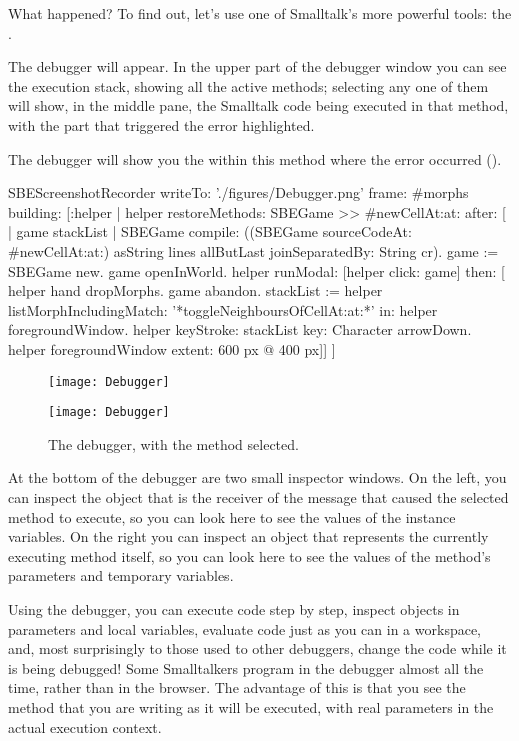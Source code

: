 \documentclass[a4paper,10pt,twoside]{book}
\begin{document}
\noindent
What happened?
To find out, let's use one of Smalltalk's more powerful tools: the .

The debugger will appear.
In the upper part of the debugger window you can see the execution stack, showing all the active methods; selecting any one of them will show, in the middle pane, the Smalltalk code being executed in that method, with the part that triggered the error highlighted.

The debugger will show you the  within this method where the error occurred ().

\begin{ExecuteSmalltalkScript}
SBEScreenshotRecorder writeTo: './figures/Debugger.png' frame: #morphs building: [:helper |
	helper restoreMethods: {SBEGame >> #newCellAt:at:} after: [
		| game stackList |
		SBEGame compile: ((SBEGame sourceCodeAt: #newCellAt:at:) asString
			lines allButLast joinSeparatedBy: String cr).
		game := SBEGame new.
		game openInWorld.
		helper
			runModal: [helper click: game]
			then: [
				helper hand dropMorphs.
				game abandon.
				stackList := helper listMorphIncludingMatch: '*toggleNeighboursOfCellAt:at:*' in: helper foregroundWindow.
				helper keyStroke: stackList key: Character arrowDown.
				helper foregroundWindow extent: 600 px @ 400 px]]
]
\end{ExecuteSmalltalkScript}
\begin{figure}[ht]
\ifluluelse
	{\centerline {\texttt{[image: Debugger]}}}
	{\centerline {\texttt{[image: Debugger]}}}
\caption{The debugger, with the method   selected.
\label{fig:debugToggle}}
\end{figure}

At the bottom of the debugger are two small inspector windows.
On the left, you can inspect the object that is the receiver of the message that caused the selected method to execute, so you can look here to see the values of the instance variables.
On the right you can inspect an object that represents the currently executing method itself, so you can look here to see the values of the method's parameters and temporary variables.

Using the debugger, you can execute code step by step, inspect objects in parameters and local variables, evaluate code just as you can in a workspace, and, most surprisingly to those used to other debuggers, change the code while it is being debugged!
Some Smalltalkers program in the debugger almost all the time, rather than in the browser.
The advantage of this is that you see the method that you are writing as it will be executed, with real parameters in the actual execution context.
\end{document}
